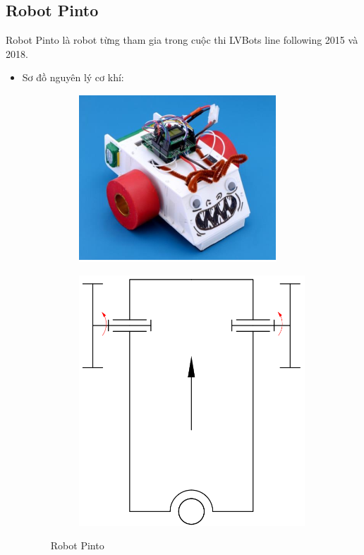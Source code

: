     \subsection{Robot Pinto}
        \hspace*{0.6cm} Robot Pinto là robot từng tham gia trong cuộc thi LVBots line following 2015 và 2018.
        \begin{itemize}
            \item Sơ đồ nguyên lý cơ khí:
            \begin{figure}[H]
                \begin{subfigure}{0.5\textwidth}
                \centering
                \includegraphics[width=0.6\linewidth, right]{pictures/chapter1/chapter1_pic11a_pinto.png} 
                \label{chap1_pic11a}
                \end{subfigure}
                \begin{subfigure}{0.6\textwidth}
                \includegraphics[width=0.5\linewidth]{pictures/chapter1/chapter1_pic11b_pinto.png}
                \label{chap1_pic11b}
                \end{subfigure}
                \caption{Robot Pinto}
                \label{chap1_pic11}

\end{figure}
\end{itemize}
